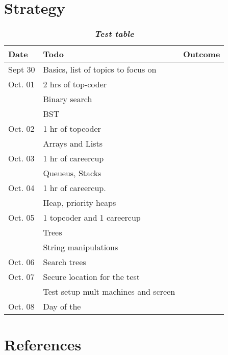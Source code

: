 \documentclass[letterpaper]{article}
\begin{document}
\section{Strategy}
\begin{table}[ht]
\centering%
\setlength{\extrarowheight}{3pt}
\caption{\bf\emph{Test table}}
\begin{tabular}{|l|l|c|}
\hline
Date   	& Todo & Outcome \\\hline\hline

Sept 30 & Basics, list of topics to focus on \\
Oct. 01 & 2 hrs of top-coder\\
	    & Binary search\\
		& BST \\
Oct. 02 & 1 hr of topcoder\\
		& Arrays and Lists\\
Oct. 03 & 1 hr of careercup\\
		& Queueus, Stacks\\
Oct. 04 & 1 hr of careercup. \\
		& Heap, priority heaps \\
Oct. 05 & 1 topcoder and 1 careercup \\
		& Trees \\
		& String manipulations\\ 
Oct. 06 & Search trees & \\
Oct. 07 & Secure location for the test \\
		& Test setup { mult machines and screen }\\ 
Oct. 08 & Day of the  \\\hline
\end{tabular}%
\end{table}

\section{References}

 
\end{document}
